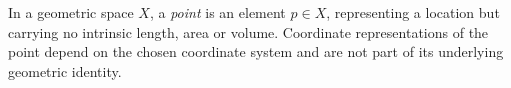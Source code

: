
In a geometric space $X$, a \emph{point} is an element $p\in X$, representing a location but carrying no intrinsic length, area or volume. Coordinate representations of the point depend on the chosen coordinate system and are not part of its underlying geometric identity.
